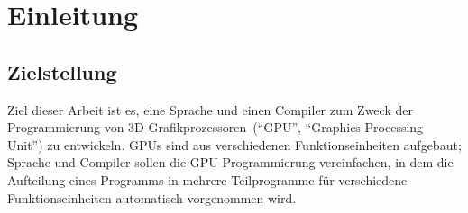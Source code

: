 \documentclass[twoside,a4paper,fleqn,12pt]{book}
\begin{document}
\newcommand\emphalt[1]{\textbf{#1}}

\newcommand\freqPerMesh[1]{\framebox{#1}}
\newcommand\freqPerVert[1]{\colorbox{SpringGreen}{\textcolor{Black}{#1}}}
\newcommand\freqPerFrag[1]{\colorbox{BlueViolet}{\textcolor{White}{#1}}}

\setcounter{secnumdepth}{3}

\chapter{Einleitung}

\section{Zielstellung}

Ziel dieser Arbeit ist es, eine Sprache und einen Compiler zum Zweck der Programmierung von
3D-Grafikprozessoren~(``\gls{GPU}'', ``Graphics Processing Unit'') zu entwickeln.
GPUs sind aus verschiedenen Funktionseinheiten aufgebaut;
Sprache und Compiler sollen die GPU-Programmierung vereinfachen, in dem die Aufteilung eines Programms in mehrere Teilprogramme
für verschiedene Funktionseinheiten automatisch vorgenommen wird.




\end{document}
